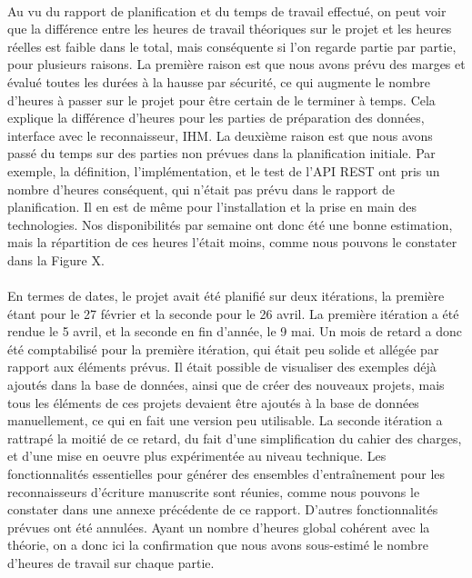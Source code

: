 \paragraph{}
Au vu du rapport de planification et du temps de travail effectué, on peut voir que la différence entre les heures de travail théoriques sur le projet et les heures réelles est faible dans le total, mais conséquente si l'on regarde partie par partie, pour plusieurs raisons. La première raison est que nous avons prévu des marges et évalué toutes les durées à la hausse par sécurité, ce qui augmente le nombre d'heures à passer sur le projet pour être certain de le terminer à temps. Cela explique la différence d'heures pour les parties de préparation des données, interface avec le reconnaisseur, IHM. La deuxième raison est que nous avons passé du temps sur des parties non prévues dans la planification initiale. Par exemple, la définition, l'implémentation, et le test de l'API REST ont pris un nombre d'heures conséquent, qui n'était pas prévu dans le rapport de planification. Il en est de même pour l'installation et la prise en main des technologies. Nos disponibilités par semaine ont donc été une bonne estimation, mais la répartition de ces heures l'était moins, comme nous pouvons le constater dans la Figure X.

\paragraph{}
En termes de dates, le projet avait été planifié sur deux itérations, la première étant pour le 27 février et la seconde pour le 26 avril. La première itération a été rendue le 5 avril, et la seconde en fin d'année, le 9 mai. Un mois de retard a donc été comptabilisé pour la première itération, qui était peu solide et allégée par rapport aux éléments prévus. Il était possible de visualiser des exemples déjà ajoutés dans la base de données, ainsi que de créer des nouveaux projets, mais tous les éléments de ces projets devaient être ajoutés à la base de données manuellement, ce qui en fait une version peu utilisable. La seconde itération a rattrapé la moitié de ce retard, du fait d'une simplification du cahier des charges, et d'une mise en oeuvre plus expérimentée au niveau technique. Les fonctionnalités essentielles pour générer des ensembles d'entraînement pour les reconnaisseurs d'écriture manuscrite sont réunies, comme nous pouvons le constater dans une annexe précédente de ce rapport. D'autres fonctionnalités prévues ont été annulées. Ayant un nombre d'heures global cohérent avec la théorie, on a donc ici la confirmation que nous avons sous-estimé le nombre d'heures de travail sur chaque partie.


